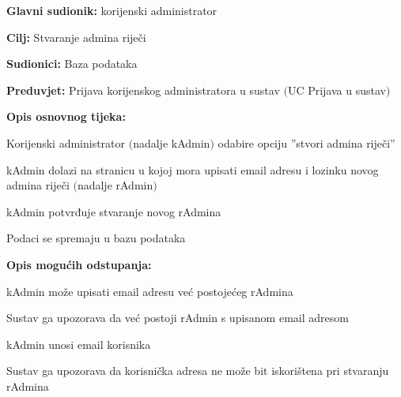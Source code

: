 					\noindent {}
					\begin{packed_item}
	
						\item \textbf{Glavni sudionik:} korijenski administrator
						\item  \textbf{Cilj:} Stvaranje admina riječi
						\item  \textbf{Sudionici:} Baza podataka
						\item  \textbf{Preduvjet:} Prijava korijenskog administratora u sustav $($UC Prijava u sustav$)$
						\item  \textbf{Opis osnovnog tijeka:}
						
						\item[] \begin{packed_enum}
	
							\item Korijenski administrator $($nadalje kAdmin$)$ odabire opciju ”stvori admina riječi”
							\item kAdmin dolazi na stranicu u kojoj mora upisati email adresu i lozinku novog admina riječi $($nadalje rAdmin$)$
							\item kAdmin potvrđuje stvaranje novog rAdmina
							\item Podaci se spremaju u bazu podataka
						\end{packed_enum}
						
						\item  \textbf{Opis mogućih odstupanja:}
						
						\item[] \begin{packed_item}
	
							\item[2.a] kAdmin može upisati email adresu već postojećeg rAdmina
							\item[] \begin{packed_enum}
								
								\item Sustav ga upozorava da već postoji rAdmin s upisanom email adresom							
							\end{packed_enum}

							\item[2.b] kAdmin unosi email korisnika
							\item[] \begin{packed_enum}
								
								\item Sustav ga upozorava da korisnička adresa ne može bit iskorištena pri stvaranju rAdmina								
							\end{packed_enum}
							
						\end{packed_item}
					\end{packed_item}

